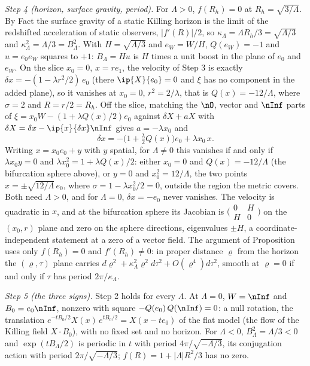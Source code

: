 \emph{Step 4 (horizon, surface gravity, period).} For $\Lambda > 0$, $f(R_{h}) = 0$ at $R_{h} = \sqrt{3/\Lambda}$. By Fact  the surface gravity of a static Killing horizon is the limit of the redshifted acceleration of static observers, $|f'(R)|/2$, so $\kappa_{\Lambda} = \Lambda R_{h}/3 = \sqrt{\Lambda/3}$ and $\kappa_{\Lambda}^{2} = \Lambda/3 = B_{\Lambda}^{2}$. With $H = \sqrt{\Lambda/3}$ and $e_{W} = W/H$, $Q(e_{W}) = -1$ and $u = e_{0}e_{W}$ squares to $+1$: $B_{\Lambda} = Hu$ is $H$ times a unit boost in the plane of $e_{0}$ and $e_{W}$. On the slice $x_{0} = 0$, $x = re_{1}$, the velocity of Step 3 is exactly $\delta x = -(1 - \lambda r^{2}/2)\,e_{0}$ (there $\ip{X}{e_{0}} = 0$ and $\xi$ has no component in the added plane), so it vanishes at $x_{0} = 0$, $r^{2} = 2/\lambda$, that is $Q(x) = -12/\Lambda$, where $\sigma = 2$ and $R = r/2 = R_{h}$. Off the slice, matching the $\nO$, vector and $\nInf$ parts of $\xi = x_{0}W - (1 + \lambda Q(x)/2)e_{0}$ against $\delta X + aX$ with $\delta X = \delta x - \ip{x}{\delta x}\nInf$ gives $a = -\lambda x_{0}$ and
\[
\delta x = -\bigl(1 + \tfrac{\lambda}{2}Q(x)\bigr)e_{0} + \lambda x_{0}\, x .
\]
Writing $x = x_{0}e_{0} + y$ with $y$ spatial, for $\Lambda \neq 0$ this vanishes if and only if $\lambda x_{0}y = 0$ and $\lambda x_{0}^{2} = 1 + \lambda Q(x)/2$: either $x_{0} = 0$ and $Q(x) = -12/\Lambda$ (the bifurcation sphere above), or $y = 0$ and $x_{0}^{2} = 12/\Lambda$, the two points $x = \pm\sqrt{12/\Lambda}\,e_{0}$, where $\sigma = 1 - \lambda x_{0}^{2}/2 = 0$, outside the region the metric covers. Both need $\Lambda > 0$, and for $\Lambda = 0$, $\delta x = -e_{0}$ never vanishes. The velocity is quadratic in $x$, and at the bifurcation sphere its Jacobian is $\bigl(\begin{smallmatrix} 0 & H \\ H & 0\end{smallmatrix}\bigr)$ on the $(x_{0}, r)$ plane and zero on the sphere directions, eigenvalues $\pm H$, a coordinate-independent statement at a zero of a vector field. The argument of Proposition  uses only $f(R_{h}) = 0$ and $f'(R_{h}) \neq 0$: in proper distance $\varrho$ from the horizon the $(\varrho, \tau)$ plane carries $d\varrho^{2} + \kappa_{\Lambda}^{2}\varrho^{2}d\tau^{2} + O(\varrho^{4})d\tau^{2}$, smooth at $\varrho = 0$ if and only if $\tau$ has period $2\pi/\kappa_{\Lambda}$.

\emph{Step 5 (the three signs).} Step 2 holds for every $\Lambda$. At $\Lambda = 0$, $W = \nInf$ and $B_{0} = e_{0}\nInf$, nonzero with square $-Q(e_{0})\,Q(\nInf) = 0$: a null rotation, the translation $e^{-tB_{0}/2}X(x)\,e^{tB_{0}/2} = X(x - te_{0})$ of the flat model (the flow of the Killing field $X \cdot B_{0}$), with no fixed set and no horizon. For $\Lambda < 0$, $B_{\Lambda}^{2} = \Lambda/3 < 0$ and $\exp(tB_{\Lambda}/2)$ is periodic in $t$ with period $4\pi/\sqrt{-\Lambda/3}$, its conjugation action with period $2\pi/\sqrt{-\Lambda/3}$; $f(R) = 1 + |\Lambda|R^{2}/3$ has no zero.

